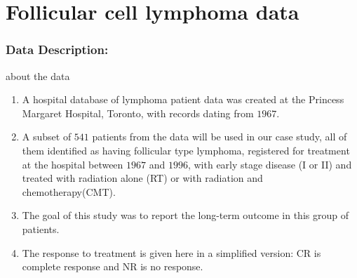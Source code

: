 \documentclass{beamer}[10]
\begin{document}
\section{Follicular cell lymphoma data}
\begin{frame}
	\frametitle{Data Description:}
	\begin{block}{about the data}
		\begin{enumerate}
			\item A hospital database of lymphoma patient data was created at the Princess Margaret Hospital, Toronto, with records dating from $1967$.
			\item A subset of $541$ patients from the data will be used in our case study, all of them identified as having follicular type lymphoma, registered for treatment at the hospital between $1967$ and $1996$, with early stage disease (I or II) and treated with radiation alone (RT) or with radiation and chemotherapy(CMT). 
			\item The goal of this study was to report the long-term outcome in this group of patients.
			\item The response to treatment is given here in a simplified version: CR is complete response and NR is no response.
		\end{enumerate}
	\end{block}
\end{frame}
\end{document}
